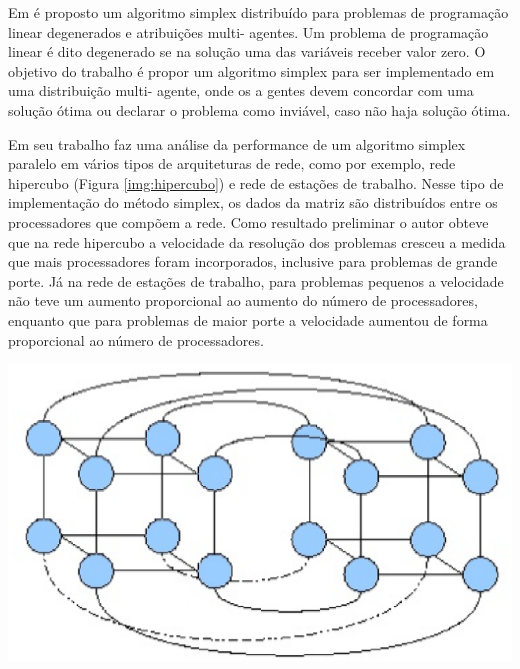 Em  é proposto um algoritmo simplex distribuído para problemas de programação linear degenerados e atribuições multi- agentes. Um problema de programação linear é dito degenerado se na solução uma das variáveis receber valor zero. O objetivo do trabalho é propor um algoritmo simplex para ser implementado em uma distribuição multi- agente, onde os a gentes devem concordar com uma solução ótima ou declarar o problema como inviável, caso não haja solução ótima.

Em seu trabalho  faz uma análise da performance de um algoritmo simplex paralelo em vários tipos de arquiteturas de rede, como por exemplo, rede hipercubo (Figura \ref{img:hipercubo}) e rede de estações de trabalho. Nesse tipo de implementação do método simplex, os dados da matriz são distribuídos entre os processadores que compõem a rede. Como resultado preliminar o autor obteve que na rede hipercubo a velocidade da resolução dos problemas cresceu a medida que mais processadores foram incorporados, inclusive para problemas de grande porte. Já na rede de estações de trabalho, para problemas pequenos a velocidade não teve um aumento proporcional ao aumento do número de processadores, enquanto que para problemas de maior porte a velocidade aumentou de forma proporcional ao número de processadores.

\begin{center}
	\includegraphics[scale=0.5]{graficos/hipercubo}
	\label{img:hipercubo}
\end{center}

